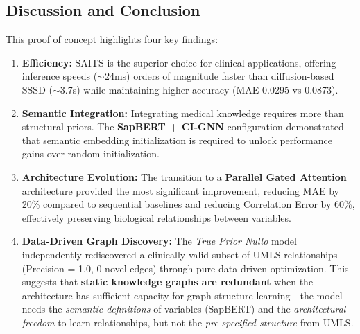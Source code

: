 \subsection{Discussion and Conclusion}
This proof of concept highlights four key findings:
\begin{enumerate}
    \item \textbf{Efficiency:} SAITS is the superior choice for clinical applications, offering inference speeds ($\sim$24ms) orders of magnitude faster than diffusion-based SSSD ($\sim$3.7s) while maintaining higher accuracy (MAE 0.0295 vs 0.0873).
    \item \textbf{Semantic Integration:} Integrating medical knowledge requires more than structural priors. The \textbf{SapBERT + CI-GNN} configuration demonstrated that semantic embedding initialization is required to unlock performance gains over random initialization.
    \item \textbf{Architecture Evolution:} The transition to a \textbf{Parallel Gated Attention} architecture provided the most significant improvement, reducing MAE by 20\% compared to sequential baselines and reducing Correlation Error by 60\%, effectively preserving biological relationships between variables.
    \item \textbf{Data-Driven Graph Discovery:} The \textit{True Prior Nullo} model independently rediscovered a clinically valid subset of UMLS relationships (Precision = 1.0, 0 novel edges) through pure data-driven optimization. This suggests that \textbf{static knowledge graphs are redundant} when the architecture has sufficient capacity for graph structure learning---the model needs the \textit{semantic definitions} of variables (SapBERT) and the \textit{architectural freedom} to learn relationships, but not the \textit{pre-specified structure} from UMLS.
\end{enumerate}